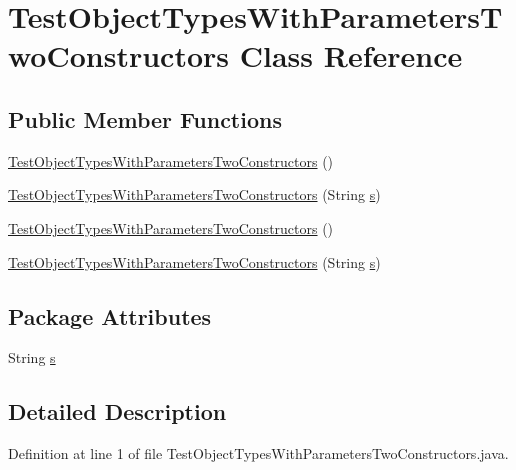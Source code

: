 \hypertarget{classTestObjectTypesWithParametersTwoConstructors}{
\section{TestObjectTypesWithParametersTwoConstructors Class Reference}
\label{classTestObjectTypesWithParametersTwoConstructors}
}
\subsection*{Public Member Functions}
\begin{DoxyCompactItemize}
\item 
\hyperlink{classTestObjectTypesWithParametersTwoConstructors_ab71baff3303f45deb4144759543b603e}{TestObjectTypesWithParametersTwoConstructors} ()
\item 
\hyperlink{classTestObjectTypesWithParametersTwoConstructors_a9723b549e228ab416ff2a672873c313a}{TestObjectTypesWithParametersTwoConstructors} (String \hyperlink{classTestObjectTypesWithParametersTwoConstructors_abe96b03841f438000a162b68ee07af9f}{s})
\item 
\hyperlink{classTestObjectTypesWithParametersTwoConstructors_ab71baff3303f45deb4144759543b603e}{TestObjectTypesWithParametersTwoConstructors} ()
\item 
\hyperlink{classTestObjectTypesWithParametersTwoConstructors_a9723b549e228ab416ff2a672873c313a}{TestObjectTypesWithParametersTwoConstructors} (String \hyperlink{classTestObjectTypesWithParametersTwoConstructors_abe96b03841f438000a162b68ee07af9f}{s})
\end{DoxyCompactItemize}
\subsection*{Package Attributes}
\begin{DoxyCompactItemize}
\item 
String \hyperlink{classTestObjectTypesWithParametersTwoConstructors_abe96b03841f438000a162b68ee07af9f}{s}
\end{DoxyCompactItemize}


\subsection{Detailed Description}


Definition at line 1 of file TestObjectTypesWithParametersTwoConstructors.java.



